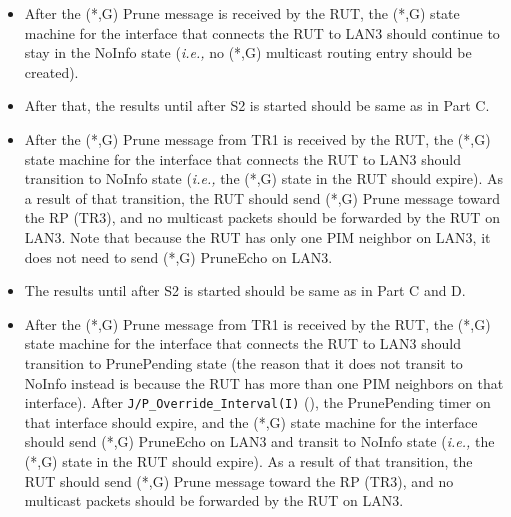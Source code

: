 \documentclass[11pt]{report}
\newcommand{\ie}{\emph{i.e.,}\xspace}
\begin{document}

\begin{itemize}

  \item After the (*,G) Prune message is received by the RUT,
  the (*,G) state machine for the interface that connects the RUT to
  LAN3 should continue to stay in the NoInfo state (\ie no (*,G) multicast
  routing entry should be created).

  \item After that, the results until after S2 is started should be same as in
  Part C.

  \item After the (*,G) Prune message from TR1 is received by the RUT,
  the (*,G) state machine for the interface that connects the RUT to
  LAN3 should transition to NoInfo state
  (\ie the (*,G) state in the RUT should expire).
  As a result of that transition, the RUT should send (*,G) Prune
  message toward the RP (TR3), and no multicast packets should be
  forwarded by the RUT on LAN3. Note that because the RUT has only one
  PIM neighbor on LAN3, it does not need to send (*,G) PruneEcho on
  LAN3.

\end{itemize}


\begin{itemize}

  \item The results until after S2 is started should be same as in
  Part C and D.

  \item After the (*,G) Prune message from TR1 is received by the RUT,
  the (*,G) state machine for the interface that connects the RUT to
  LAN3 should transition to PrunePending state (the reason that it does
  not transit to NoInfo instead is because the RUT has more than one PIM
  neighbors on that interface).
  After \verb=J/P_Override_Interval(I)= (\PimsmJPOverrideIntervalI),
  the PrunePending timer on that interface should expire, and the
  (*,G) state machine for the interface should send (*,G) PruneEcho
  on LAN3 and transit to NoInfo
  state (\ie the (*,G) state in the RUT should expire).
  As a result of that transition, the RUT should send (*,G) Prune
  message toward the RP (TR3), and no multicast packets should be
  forwarded by the RUT on LAN3.

\end{itemize}
\end{document}
